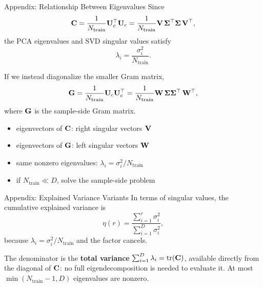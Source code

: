 \documentclass[10pt,aspectratio=169]{ntuabeamer}
\begin{document}
\begin{frame}{Appendix: Relationship Between Eigenvalues}
  \small
  Since
  \[
    \mathbf{C} = \frac{1}{N_{\mathrm{train}}}\mathbf{U}_c^{\top}\mathbf{U}_c
    = \frac{1}{N_{\mathrm{train}}}\mathbf{V}\,\mathbf{\Sigma}^{\top}\mathbf{\Sigma}\,\mathbf{V}^{\top},
  \]
  the PCA eigenvalues and SVD singular values satisfy
  \[
    \lambda_i = \frac{\sigma_i^2}{N_{\mathrm{train}}}.
  \]

  If we instead diagonalize the smaller Gram matrix,
  \[
    \mathbf{G} = \frac{1}{N_{\mathrm{train}}}\mathbf{U}_c\mathbf{U}_c^{\top}
    = \frac{1}{N_{\mathrm{train}}}\mathbf{W}\,\mathbf{\Sigma}\mathbf{\Sigma}^{\top}\,\mathbf{W}^{\top},
  \]
  where \(\mathbf{G}\) is the sample-side Gram matrix.
  \begin{itemize}
    \item eigenvectors of \(\mathbf{C}\): right singular vectors \(\mathbf{V}\)
    \item eigenvectors of \(\mathbf{G}\): left singular vectors \(\mathbf{W}\)
    \item same nonzero eigenvalues: \(\lambda_i = \sigma_i^2/N_{\mathrm{train}}\)
    \item if \(N_{\mathrm{train}} \ll D\), solve the sample-side problem
  \end{itemize}
\end{frame}

\begin{frame}{Appendix: Explained Variance Variants}
  \small
  In terms of singular values, the cumulative explained variance is
  \[
    \eta(r) = \frac{\sum_{i=1}^{r}\sigma_i^2}{\sum_{i=1}^{D}\sigma_i^2},
  \]
  because \(\lambda_i=\sigma_i^2/N_{\mathrm{train}}\) and the factor cancels.

  \vspace{0.4em}
  The denominator is the \textbf{total variance}
  \(\sum_{i=1}^{D}\lambda_i = \mathrm{tr}(\mathbf{C})\),
  available directly from the diagonal of \(\mathbf{C}\): no full eigendecomposition is needed to evaluate it.
  At most \(\min(N_{\mathrm{train}}-1,D)\) eigenvalues are nonzero.
\end{frame}
\end{document}
